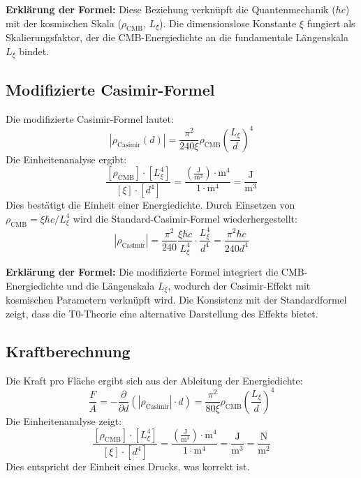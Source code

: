 \documentclass{article}
\begin{document}
	\textbf{Erklärung der Formel:} Diese Beziehung verknüpft die Quantenmechanik ($\hbar c$) mit der kosmischen Skala ($\rho_{\text{CMB}}$, $L_\xi$). Die dimensionslose Konstante $\xi$ fungiert als Skalierungsfaktor, der die CMB-Energiedichte an die fundamentale Längenskala $L_\xi$ bindet.
	
	\subsection{Modifizierte Casimir-Formel}
	Die modifizierte Casimir-Formel lautet:
	\begin{equation}
		|\rho_{\text{Casimir}}(d)| = \frac{\pi^2}{240 \xi} \rho_{\text{CMB}} \left( \frac{L_\xi}{d} \right)^4
	\end{equation}
	Die Einheitenanalyse ergibt:
	\begin{equation}
		\frac{[\rho_{\text{CMB}}] \cdot [L_\xi^4]}{[\xi] \cdot [d^4]} = \frac{\left( \frac{\text{J}}{\text{m}^3} \right) \cdot \text{m}^4}{1 \cdot \text{m}^4} = \frac{\text{J}}{\text{m}^3}
	\end{equation}
	Dies bestätigt die Einheit einer Energiedichte. Durch Einsetzen von $\rho_{\text{CMB}} = \xi \hbar c / L_\xi^4$ wird die Standard-Casimir-Formel wiederhergestellt:
	\begin{equation}
		|\rho_{\text{Casimir}}| = \frac{\pi^2}{240} \frac{\xi \hbar c}{L_\xi^4} \cdot \frac{L_\xi^4}{d^4} = \frac{\pi^2 \hbar c}{240 d^4}
	\end{equation}
	
	\textbf{Erklärung der Formel:} Die modifizierte Formel integriert die CMB-Energiedichte und die Längenskala $L_\xi$, wodurch der Casimir-Effekt mit kosmischen Parametern verknüpft wird. Die Konsistenz mit der Standardformel zeigt, dass die T0-Theorie eine alternative Darstellung des Effekts bietet.
	
	\subsection{Kraftberechnung}
	Die Kraft pro Fläche ergibt sich aus der Ableitung der Energiedichte:
	\begin{equation}
		\frac{F}{A} = -\frac{\partial}{\partial d} \left( |\rho_{\text{Casimir}}| \cdot d \right) = \frac{\pi^2}{80 \xi} \rho_{\text{CMB}} \left( \frac{L_\xi}{d} \right)^4
	\end{equation}
	Die Einheitenanalyse zeigt:
	\begin{equation}
		\frac{[\rho_{\text{CMB}}] \cdot [L_\xi^4]}{[\xi] \cdot [d^4]} = \frac{\left( \frac{\text{J}}{\text{m}^3} \right) \cdot \text{m}^4}{1 \cdot \text{m}^4} = \frac{\text{J}}{\text{m}^3} = \frac{\text{N}}{\text{m}^2}
	\end{equation}
	Dies entspricht der Einheit eines Drucks, was korrekt ist.
	
\end{document}
